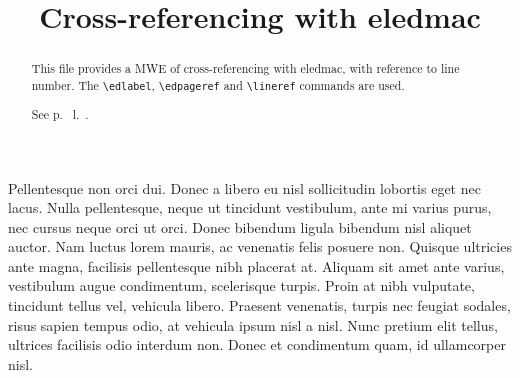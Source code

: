 \documentclass{article}
\begin{document}
\begin{english}
\title{Cross-referencing with eledmac}
\date{}
\maketitle
\begin{abstract}
This file provides a MWE of cross-referencing with eledmac, with reference to line number.
The \verb+\edlabel+, \verb+\edpageref+ and \verb+\lineref+ commands are used.

See p.~ l.~.
\end{abstract}
\end{english}

\beginnumbering

\pstart
Pellentesque non orci dui. Donec a libero eu nisl sollicitudin lobortis eget nec lacus. Nulla pellentesque, neque ut tincidunt vestibulum, ante mi varius purus, nec cursus neque orci ut orci. Donec bibendum ligula bibendum nisl aliquet auctor. Nam luctus lorem mauris, ac venenatis felis posuere non. Quisque ultricies ante magna, facilisis pellentesque nibh placerat at. Aliquam sit amet ante varius, vestibulum augue condimentum, scelerisque turpis. Proin at nibh vulputate, tincidunt tellus vel, vehicula libero. Praesent venenatis, turpis nec feugiat sodales, risus sapien tempus odio, at vehicula ipsum nisl a nisl. Nunc pretium elit tellus, ultrices facilisis odio interdum non. Donec et condimentum quam, id ullamcorper nisl.
\pend
\end{document}
